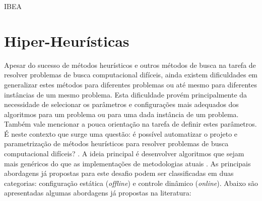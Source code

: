 \begin{algorithm}[htb!]
	\begin{algorithmic}[1]
		
		
		
		
		\EndWhile
		
		\EndWhile
		
	\end{algorithmic}
	\caption{IBEA}
	\label{alg:ibea}
\end{algorithm}


\section{Hiper-Heurísticas }
\label{Hiper-Heuristicas}

Apesar do sucesso de métodos heurísticos e outros métodos de busca na tarefa de resolver problemas de busca computacional difíceis, ainda existem dificuldades em generalizar estes métodos para diferentes problemas ou até mesmo para diferentes instâncias de um mesmo problema. Esta dificuldade provém principalmente da necessidade de selecionar os parâmetros e configurações mais adequados dos algoritmos para um problema ou para uma dada instância de um problema. Também vale mencionar a pouca orientação na tarefa de definir estes parâmetros.  É neste contexto que surge uma questão: é possível automatizar o projeto e parametrização de métodos heurísticos para resolver problemas de busca computacional difíceis? \cite{burke2013hyper}. A ideia principal é desenvolver algoritmos que sejam mais genéricos do que as implementações de metodologias atuais \cite{burke2013hyper}. As principais abordagens já propostas para este desafio podem ser classificadas em duas categorias: configuração estática (\textit{offline}) e controle dinâmico (\textit{online}). Abaixo são apresentadas algumas abordagens já propostas na literatura:

